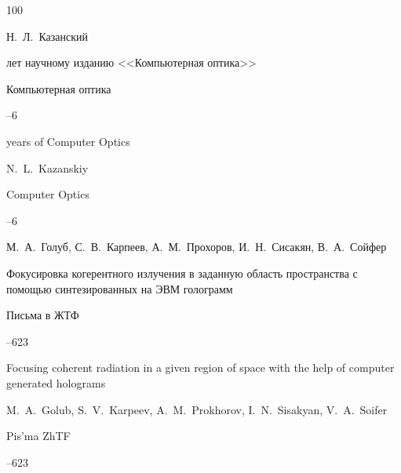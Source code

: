 \renewcommand{\baselinestretch}{0.93}



\begin{thebibliography}{100}




\by Н.~Л.~Казанский

 лет научному изданию <<Компьютерная оптика>>

\jour Компьютерная оптика




--6

\misctransl

 years of Computer Optics

\by N.~L.~Kazanskiy

\jour Computer Optics 




--6








\by М.~А.~Голуб, С.~В.~Карпеев, А.~М.~Прохоров, И.~Н.~Сисакян, В.~А.~Сойфер

\paper Фокусировка когерентного излучения в заданную область пространства с помощью синтезированных на ЭВМ голограмм

\jour Письма в ЖТФ




--623

\misctransl

\paper  Focusing coherent radiation in a given region of space with the help of computer generated holograms

\by  M.~A.~Golub, S.~V.~Karpeev, A.~M.~Prokhorov, I.~N.~Sisakyan, V.~A.~Soifer

\jour Pis'ma ZhTF




--623








\end{thebibliography}
